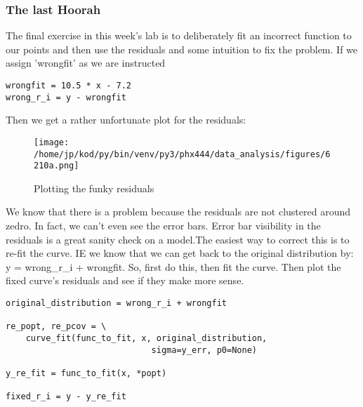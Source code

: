\documentclass{article}
\begin{document}
\subsubsection{The last Hoorah}
The final exercise in this week's lab is to deliberately fit an incorrect
function to our points and then use the residuals and some intuition to fix the
problem. If we assign 'wrongfit' as we are instructed

\begin{center}
\begin{minipage}[t]{.75\textwidth}
\begin{lstlisting}[frame=tlrb]
wrongfit = 10.5 * x - 7.2
wrong_r_i = y - wrongfit
\end{lstlisting}
\end{minipage}
\end{center}
Then we get a rather unfortunate plot for the residuals:
\begin{figure}[H]
        \begin{center}
        \texttt{[image: /home/jp/kod/py/bin/venv/py3/phx444/data\_analysis/figures/6210a.png]}
        \caption{Plotting the funky residuals}
        \label{fig:fig_21}
        \end{center}
\end{figure}

We know that there is a problem because the residuals are not clustered around
zedro. In fact, we can't even see the error bars. Error bar visibility in the
residuals is a great sanity check on a model.The easiest way to correct this
is to re-fit the curve. IE we know that we can get back to the original
distribution by: y = wrong\_r\_i + wrongfit. So, first do this, then fit the curve.
Then plot the fixed curve's residuals and see if they make more sense.

\begin{center}
\begin{minipage}[t]{.75\textwidth}
    \begin{verbatim}
original_distribution = wrong_r_i + wrongfit

re_popt, re_pcov = \
    curve_fit(func_to_fit, x, original_distribution,
                             sigma=y_err, p0=None)

y_re_fit = func_to_fit(x, *popt)

fixed_r_i = y - y_re_fit
\end{verbatim}
\end{minipage}
\end{center}
\end{document}
